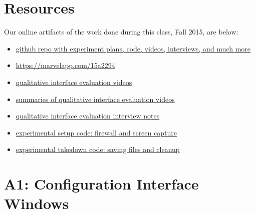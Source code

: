 \documentclass{template}
\begin{document}
\section{Resources}
\noindent Our online artifacts of the work done during this class, Fall 2015,
are below: 
\begin{itemize} \itemsep1pt \parskip0pt 
\item \href{https://github.com/lindanlee/circumvention-ux-tor}{github repo with experiment plans, code, videos, interviews, and much more}
\item \href {a clickable prototype of our interface redesign}{https://marvelapp.com/15a2294}
\item \href{https://github.com/lindanlee/circumvention-ux-tor/tree/master/sessions/pre/videos}{qualitative interface evaluation videos}
\item \href{https://github.com/lindanlee/circumvention-ux-tor/blob/master/sessions/pre/participant-summaries.txt}{summaries of qualitative interface evaluation videos}
\item \href{https://github.com/lindanlee/circumvention-ux-tor/tree/master/sessions/pre/notes}{qualitative interface evaluation interview notes}
\item \href{https://github.com/lindanlee/circumvention-ux-tor/blob/master/setup/setup-environment}{experimental setup code: firewall and screen capture} 
\item \href{https://github.com/lindanlee/circumvention-ux-tor/blob/master/setup/takedown-environment}{experimental takedown code: saving files and cleanup} 
\end{itemize}



 

\appendix
\section*{A1: Configuration Interface Windows}
\end{document}
